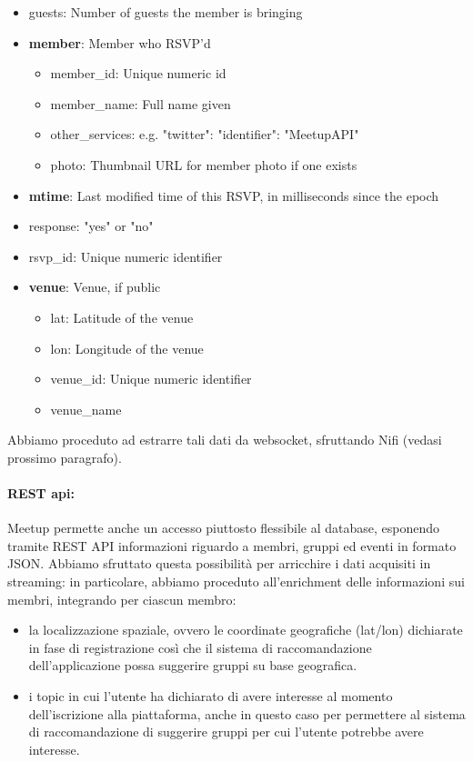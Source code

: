 \documentclass[fleqn,10pt]{SelfArx} %
\begin{document}
{\begin{itemize}[noitemsep]
\item guests: Number of guests the member is bringing
\item \textbf{member}: Member who RSVP'd
	\begin{itemize}[noitemsep]
    \item member\_id: Unique numeric id
    \item member\_name: Full name given
    \item other\_services: e.g. {"twitter": {"identifier": "MeetupAPI"}}
    \item photo: Thumbnail URL for member photo if one exists
	\end{itemize}
\item \textbf{mtime}: Last modified time of this RSVP, in milliseconds since the epoch
\item response: "yes" or "no"
\item rsvp\_id: Unique numeric identifier
\item \textbf{venue}: Venue, if public
	\begin{itemize}[noitemsep]
    \item lat: Latitude of the venue
    \item lon: Longitude of the venue
    \item venue\_id: Unique numeric identifier
    \item venue\_name
	\end{itemize}    
\end{itemize}
Abbiamo proceduto ad estrarre tali dati da websocket, sfruttando Nifi (vedasi prossimo paragrafo).
\paragraph{REST api:} Meetup permette anche un accesso piuttosto flessibile al database, esponendo tramite REST API informazioni riguardo a membri, gruppi ed eventi in formato JSON. Abbiamo sfruttato questa possibilità per arricchire i dati acquisiti in streaming: in particolare, abbiamo proceduto all'enrichment delle informazioni sui membri, integrando per ciascun membro:
\begin{itemize}[noitemsep]
\item la localizzazione spaziale, ovvero le coordinate geografiche (lat/lon) dichiarate in fase di registrazione così che il sistema di raccomandazione dell'applicazione possa suggerire gruppi su base geografica.
\item i topic in cui l'utente ha dichiarato di avere interesse al momento dell'iscrizione alla piattaforma, anche in questo caso per permettere al sistema di raccomandazione di suggerire gruppi per cui l'utente potrebbe avere interesse.
\end{itemize}
}
\end{document}
